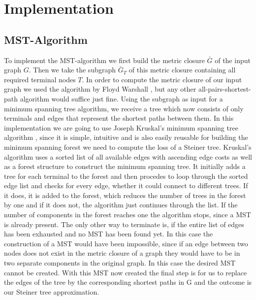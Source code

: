 
\chapter{Implementation}\label{chapter:implementation}



\section{MST-Algorithm}

To implement the MST-algorithm we first build the metric closure $\bar{G}$ of the input graph $G$. Then we take the subgraph $\bar{G}_T$ of this metric closure containing all required terminal nodes $T$. In order to compute the metric closure of our input graph we used the algorithm by Floyd Warshall \cite{hougardy2010floyd}, but any other all-pairs-shortest-path algorithm would suffice just fine. Using the subgraph as input for a minimum spanning tree algorithm, we receive a tree which now consists of only terminals and edges that represent the shortest paths between them. In this implementation we are going to use Joseph Kruskal's minimum spanning tree algorithm \cite{kruskal1956shortest}, since it is simple, intuitive and is also easily reusable for building the minimum spanning forest we need to compute the loss of a Steiner tree. Kruskal's algorithm uses a sorted list of all available edges with ascending edge costs as well as a forest structure to construct the minimum spanning tree. It initially adds a tree for each terminal to the forest and then procedes to loop through the sorted edge list and checks for every edge, whether it could connect to different trees. If it does, it is added to the forest, which reduces the number of trees in the forest by one and if it does not, the algorithm just continues through the list. If the number of components in the forest reaches one the algorithm stops, since a MST is already present. The only other way to terminate is, if the entire list of edges has been exhausted and no MST has been found yet. In this case the construction of a MST would have been impossible, since if an edge between two nodes does not exist in the metric closure of a graph they would have to be in two separate components in the original graph. In this case the desired MST cannot be created. With this MST now created the final step is for us to replace the edges of the tree by the corresponding shortest paths in G and the outcome is our Steiner tree approximation.

